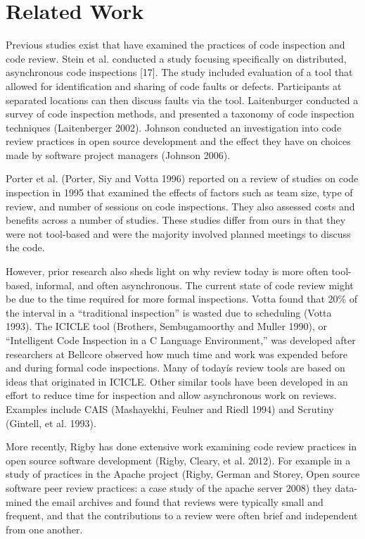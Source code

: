 
\section{Related Work} \label{sec:related_work}


Previous studies exist that have examined the practices of code inspection and
code review.  Stein et al. conducted a study focusing specifically on
distributed, asynchronous code inspections [17]. The study included evaluation
of a tool that allowed for identification and sharing of code faults or
defects. Participants at separated locations can then discuss faults via the
tool. Laitenburger conducted a survey of code inspection methods, and presented
a taxonomy of code inspection techniques (Laitenberger 2002). Johnson conducted
an investigation into code review practices in open source development and the
effect they have on choices made by software project managers (Johnson 2006).

Porter et al. (Porter, Siy and Votta 1996) reported on a review of studies on
code inspection in 1995 that examined the effects of factors such as team size,
type of review, and number of sessions on code inspections.  They also assessed
costs and benefits across a number of studies.  These studies differ from ours
in that they were not tool-based and were the majority involved planned
meetings to discuss the code.

However, prior research also sheds light on why review today is more often
tool-based, informal, and often asynchronous. The current state of code review
might be due to the time required for more formal inspections.  Votta found
that 20\% of the interval in a ``traditional inspection'' is wasted due to
scheduling (Votta 1993). The ICICLE tool (Brothers, Sembugamoorthy and Muller
1990), or ``Intelligent Code Inspection in a C Language Environment,'' was
developed after researchers at Bellcore observed how much time and work was
expended before and during formal code inspections. Many of todayís review
tools are based on ideas that originated in ICICLE.  Other similar tools have
been developed in an effort to reduce time for inspection and allow
asynchronous work on reviews.   Examples include CAIS  (Mashayekhi, Feulner and
Riedl 1994) and Scrutiny (Gintell, et al. 1993).

More recently, Rigby has done extensive work examining code review practices in
open source software development (Rigby, Cleary, et al. 2012).  For example in
a study of practices in the Apache project (Rigby, German and Storey, Open
source software peer review practices: a case study of the apache server 2008)
they data-mined the email archives and found that reviews were typically small
and frequent, and that the contributions to a review were often brief and
independent from one another.

